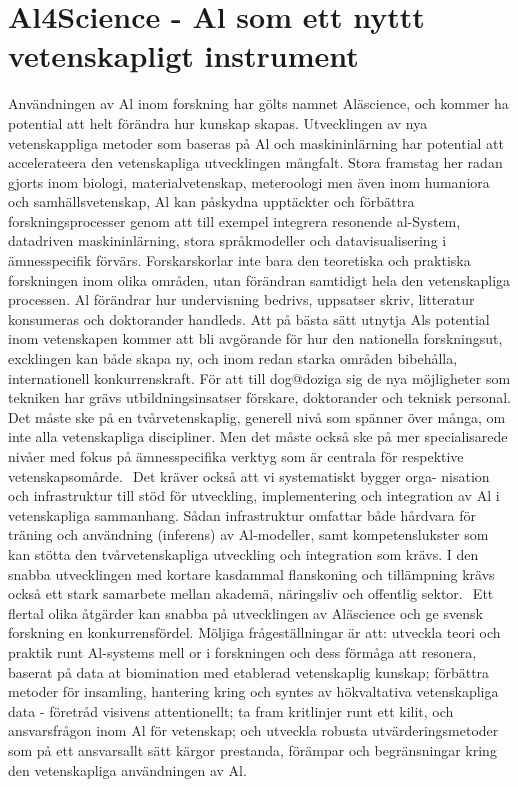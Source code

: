 {{{{{{{{{{{{{{\section*{Al4Science - Al som ett nyttt vetenskapligt instrument}
Användningen av Al inom forskning har gölts namnet Aläscience, och kommer ha potential att helt förändra hur kunskap skapas. Utvecklingen av nya vetenskappliga metoder som baseras på Al och maskininlärning har potential att accelerateera den vetenskapliga utvecklingen mångfalt. Stora framstag her radan gjorts inom biologi, materialvetenskap, meteroologi men även inom humaniora och samhällsvetenskap, Al kan påskydna upptäckter och förbättra forskningsprocesser genom att till exempel integrera resonende al-System, datadriven maskininlärning, stora språkmodeller och datavisualisering i ämnesspecifik förvärs.
Forskarskorlar inte bara den teoretiska och praktiska forskningen inom olika områden, utan förändran samtidigt hela den vetenskapliga processen. Al förändrar hur undervisning bedrivs, uppsatser skriv, litteratur konsumeras och doktorander handleds. Att på bästa sätt utnytja Als potential inom vetenskapen kommer att bli avgörande för hur den nationella forskningsut, excklingen kan både skapa ny, och inom redan starka områden bibehålla, internationell konkurrenskraft. För att till dog@doziga sig de nya möjligheter som tekniken har grävs utbildningsinsatser förskare, doktorander och teknisk personal. Det måste ske på en tvårvetenskaplig, generell nivå som spänner över många, om inte alla vetenskapliga discipliner. Men det
måste också ske på mer specialisarede nivåer med fokus på ämnesspecifika verktyg som är centrala för respektive vetenskapsomårde. \({ }^{}\)
Det kräver också att vi systematiskt bygger orga- nisation och infrastruktur till stöd för utveckling, implementering och integration av Al i vetenskapliga sammanhang. Sådan infrastruktur omfattar både hårdvara för träning och användning (inferens) av Al-modeller, samt kompetenslukster som kan stötta den tvårvetenskapliga utveckling och integration som krävs. I den snabba utvecklingen med kortare kasdammal flanskoning och tillämpning krävs också ett stark samarbete mellan akademä, näringsliv och offentlig sektor. \({ }^{}\)
Ett flertal olika åtgärder kan snabba på utvecklingen av Aläscience och ge svensk forskning en konkurrensfördel. Möljiga frågeställningar är att: utveckla teori och praktik runt Al-systems mell or i forskningen och dess förmåga att resonera, baserat på data at biomination med etablerad vetenskaplig kunskap; förbättra metoder för insamling, hantering kring och syntes av hökvaltativa vetenskapliga data - företråd visivens attentionellt; ta fram kritlinjer runt ett kilit, och ansvarsfrågon inom Al för vetenskap; och utveckla robusta utvärderingsmetoder som på ett ansvarsallt sätt kärgor prestanda, förämpar och begränsningar kring den vetenskapliga användningen av Al.

}}}}}}}}}}}}}}
